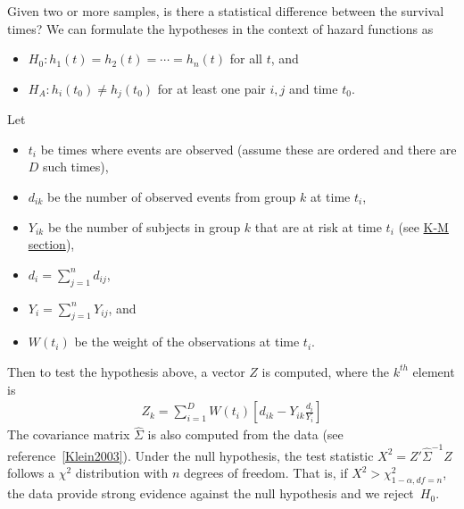 \documentclass[11pt]{article}
\begin{document}
\pagebreak

{} \vspace{-1mm}\par
{}
\label{testsForTwoOrMoreSamples}

Given two or more samples, is there a statistical difference between the survival times? We can formulate the hypotheses in the context of hazard functions as
\begin{itemize}
\item $H_0: h_1(t) = h_2(t) = \cdots = h_n(t)$ for all $t$, and
\item $H_A: h_i(t_0)\neq h_j(t_0)$ for at least one pair $i,j$ and time $t_0$.
\end{itemize}
Let
\begin{itemize}
\item $t_{i}$ be times where events are observed (assume these are ordered and there are $D$ such times),
\item $d_{ik}$ be the number of observed events from group $k$ at time $t_i$,
\item $Y_{ik}$ be the number of subjects in group $k$ that are at risk at time $t_i$ (see \hyperref[kapMeiEstimateAndBounds]{K-M section}),
\item $d_{i} = \sum_{j=1}^n d_{ij}$,
\item $Y_{i} = \sum_{j=1}^n Y_{ij}$, and
\item $W(t_i)$ be the weight of the observations at time $t_i$.
\end{itemize}
Then to test the hypothesis above, a vector $Z$ is computed, where the $k^{th}$ element is
\begin{eqnarray*}
Z_k = \sum_{i=1}^D W(t_i)\left[d_{ik} - Y_{ik}\frac{d_{i}}{Y_{i}}\right]
\end{eqnarray*}
The covariance matrix $\widehat{\Sigma}$ is also computed from the data (see reference~\ref{Klein2003}). Under the null hypothesis, the test statistic $X^2 = Z'\hat{\Sigma}^{-1}Z$ follows a $\chi^2$ distribution with $n$ degrees of freedom. That is, if $X^2 > \chi^2_{1-\alpha, df=n}$, the data provide strong evidence against the null hypothesis and we reject~$H_0$.
\end{document}
